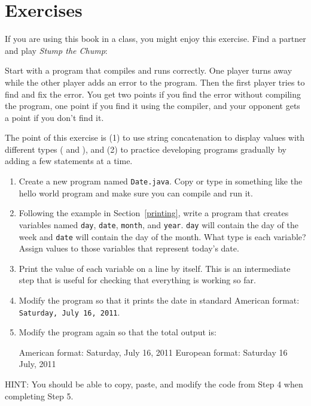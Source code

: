 \section{Exercises}


\begin{exercise}

If you are using this book in a class, you might enjoy this exercise.
Find a partner and play {\it Stump the Chump}:

Start with a program that compiles and runs correctly.
One player turns away while the other player adds an error to the program.
Then the first player tries to find and fix the error.
You get two points if you find the error without compiling the program, one point if you find it using the compiler, and your opponent gets a point if you don't find it.

\end{exercise}


\begin{exercise}
\label{ex.date}

The point of this exercise is (1) to use string concatenation to display values with different types ( and ), and (2) to practice developing programs gradually by adding a few statements at a time.

\begin{enumerate}

\item Create a new program named {\tt Date.java}.
Copy or type in something like the hello world program and make sure you can compile and run it.

\item Following the example in Section~\ref{printing}, write a program that creates variables named {\tt day}, {\tt date}, {\tt month}, and {\tt year}.
{\tt day} will contain the day of the week and {\tt date} will contain the day of the month.
What type is each variable?
Assign values to those variables that represent today's date.

\item Print the value of each variable on a line by itself.
This is an intermediate step that is useful for checking that everything is working so far.

\item Modify the program so that it prints the date in standard American format: {\tt Saturday, July 16, 2011}.

\item Modify the program again so that the total output is:

\begin{stdout}
American format:
Saturday, July 16, 2011
European format:
Saturday 16 July, 2011
\end{stdout}

\end{enumerate}

HINT: You should be able to copy, paste, and modify the code from Step 4 when completing Step 5.

\end{exercise}



